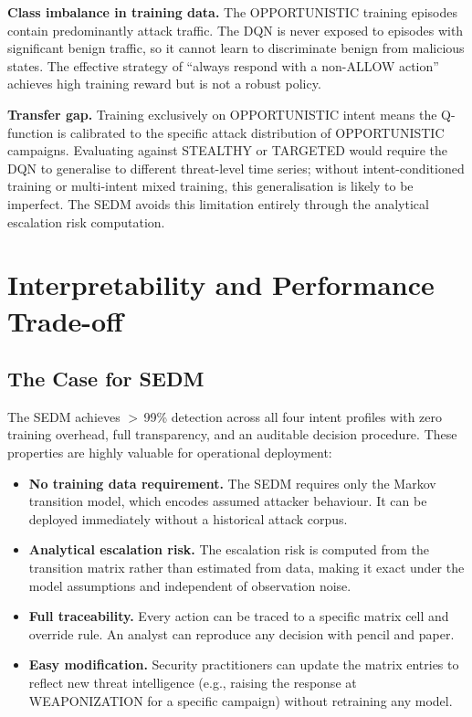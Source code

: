 \textbf{Class imbalance in training data.}
The OPPORTUNISTIC training episodes contain predominantly attack traffic.
The DQN is never exposed to episodes with significant benign traffic,
so it cannot learn to discriminate benign from malicious states.
The effective strategy of ``always respond with a non-ALLOW action'' achieves
high training reward but is not a robust policy.

\textbf{Transfer gap.}
Training exclusively on OPPORTUNISTIC intent means the Q-function is
calibrated to the specific attack distribution of OPPORTUNISTIC campaigns.
Evaluating against STEALTHY or TARGETED would require the DQN to generalise
to different threat-level time series; without intent-conditioned training
or multi-intent mixed training, this generalisation is likely to be
imperfect.
The SEDM avoids this limitation entirely through the analytical escalation
risk computation.

\section{Interpretability and Performance Trade-off}
\label{sec:disc_tradeoff}

\subsection{The Case for SEDM}

The SEDM achieves $>$\,99\% detection across all four intent profiles with
zero training overhead, full transparency, and an auditable decision
procedure.
These properties are highly valuable for operational deployment:
%
\begin{itemize}
  \item \textbf{No training data requirement.}
        The SEDM requires only the Markov transition model, which encodes
        assumed attacker behaviour.
        It can be deployed immediately without a historical attack corpus.
  \item \textbf{Analytical escalation risk.}
        The escalation risk is computed from the transition matrix rather
        than estimated from data, making it exact under the model assumptions
        and independent of observation noise.
  \item \textbf{Full traceability.}
        Every action can be traced to a specific matrix cell and override
        rule.
        An analyst can reproduce any decision with pencil and paper.
  \item \textbf{Easy modification.}
        Security practitioners can update the matrix entries to reflect new
        threat intelligence (e.g., raising the response at WEAPONIZATION
        for a specific campaign) without retraining any model.
\end{itemize}

